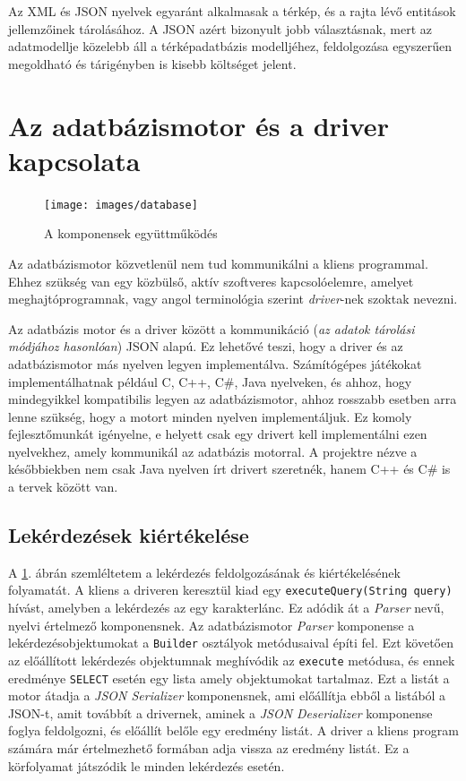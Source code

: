 Az XML és JSON nyelvek egyaránt alkalmasak a térkép, és a rajta lévő entitások jellemzőinek tárolásához. A JSON azért bizonyult jobb választásnak, mert az adatmodellje közelebb áll a térképadatbázis modelljéhez, feldolgozása egyszerűen megoldható és tárigényben is kisebb költséget jelent.

\section{Az adatbázismotor és a driver kapcsolata}

\begin{figure}[htb]
	\begin{center}
		\texttt{[image: images/database]}
		\caption{A komponensek együttműködés}
		\label{fig:database}
	\end{center}
\end{figure}

Az adatbázismotor közvetlenül nem tud kommunikálni a kliens programmal. Ehhez szükség van egy közbülső, aktív szoftveres kapcsolóelemre, amelyet meghajtóprogramnak, vagy angol terminológia szerint \textit{driver}-nek szoktak nevezni.

Az adatbázis motor és a driver között a kommunikáció (\textit{az adatok tárolási módjához hasonlóan}) JSON alapú. Ez lehetővé teszi, hogy a driver és az adatbázismotor más nyelven legyen implementálva. Számítógépes játékokat implementálhatnak például C, C++, C\#, Java nyelveken, és ahhoz, hogy mindegyikkel kompatibilis legyen az adatbázismotor, ahhoz rosszabb esetben arra lenne szükség, hogy a motort minden nyelven implementáljuk. Ez komoly fejlesztőmunkát igényelne, e helyett csak egy drivert kell implementálni ezen nyelvekhez, amely kommunikál az adatbázis motorral. A projektre nézve a későbbiekben nem csak Java nyelven írt drivert szeretnék, hanem C++ és C\# is a tervek között van.

\subsection{Lekérdezések kiértékelése}

A \ref{fig:database}. ábrán szemléltetem a lekérdezés feldolgozásának és kiértékelésének folyamatát. A kliens a driveren keresztül kiad egy \texttt{executeQuery(String query)} hívást, amelyben a lekérdezés az egy karakterlánc. Ez adódik át a \textit{Parser} nevű, nyelvi értelmező komponensnek. Az adatbázismotor \textit{Parser} komponense a lekérdezésobjektumokat a \texttt{Builder} osztályok metódusaival építi fel. Ezt követően az előállított lekérdezés objektumnak meghívódik az \texttt{execute} metódusa, és ennek eredménye \texttt{SELECT} esetén egy lista amely objektumokat tartalmaz. Ezt a listát a motor átadja a \textit{JSON Serializer} komponensnek, ami előállítja ebből a listából a JSON-t, amit továbbít a drivernek, aminek a \textit{JSON Deserializer} komponense foglya feldolgozni, és előállít belőle egy eredmény listát. A driver a kliens program számára már értelmezhető formában adja vissza az eredmény listát. Ez a körfolyamat játszódik le minden lekérdezés esetén.

